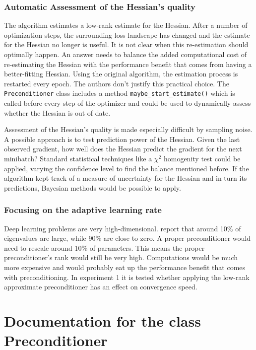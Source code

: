 \documentclass[twoside,12pt,a4paper]{report}
\begin{document}
\subsubsection{Automatic Assessment of the Hessian's quality}
The algorithm estimates a low-rank estimate for the Hessian. After a number of optimization steps, the surrounding loss landscape has changed and the estimate for the Hessian no longer is useful.
It is not clear when this re-estimation should optimally happen. An answer needs to balance the added computational cost of re-estimating the Hessian with the performance benefit that comes from having a better-fitting Hessian.
Using the original algorithm, the estimation process is restarted every epoch. The authors don't justify this practical choice.
The \verb|Preconditioner| class includes a method \verb|maybe_start_estimate()| which is called before every step of the optimizer and could be used to dynamically assess whether the Hessian is out of date.

Assessment of the Hessian's quality is made especially difficult by sampling noise. A possible approach is to test prediction power of the Hessian. Given the last observed gradient, how well does the Hessian predict the gradient for the next minibatch? Standard statistical techniques like a $\chi^2$ homogenity test could be applied, varying the confidence level to find the balance mentioned before.
If the algorithm kept track of a measure of uncertainty for the Hessian and in turn its predictions, Bayesian methods would be possible to apply.

\subsubsection{Focusing on the adaptive learning rate}
Deep learning problems are very high-dimensional. \cite{Chaudhari2017entropy} report that around 10\% of eigenvalues are large, while 90\% are close to zero. A proper preconditioner would need to rescale around 10\% of parameters. This means the proper preconditioner's rank would still be very high. Computations would be much more expensive and would probably eat up the performance benefit that comes with preconditioning.
In experiment 1 it is tested whether applying the low-rank approximate preconditioner has an effect on convergence speed.

\section{Documentation for the class Preconditioner}
\end{document}
